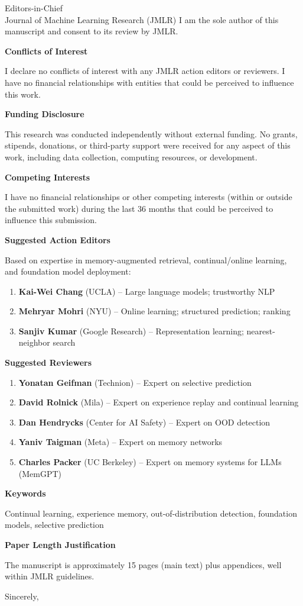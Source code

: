 \documentclass[11pt]{letter}
\begin{document}
\begin{letter}{Editors-in-Chief\\Journal of Machine Learning Research (JMLR)}
I am the sole author of this manuscript and consent to its review by JMLR.

\noindent\textbf{Conflicts of Interest}

I declare no conflicts of interest with any JMLR action editors or reviewers. I have no financial relationships with entities that could be perceived to influence this work.

\noindent\textbf{Funding Disclosure}

This research was conducted independently without external funding. No grants, stipends, donations, or third-party support were received for any aspect of this work, including data collection, computing resources, or development.

\noindent\textbf{Competing Interests}

I have no financial relationships or other competing interests (within or outside the submitted work) during the last 36 months that could be perceived to influence this submission.

\noindent\textbf{Suggested Action Editors}

Based on expertise in memory-augmented retrieval, continual/online learning, and foundation model deployment:
\begin{enumerate}
    \item \textbf{Kai-Wei Chang} (UCLA) -- Large language models; trustworthy NLP
    \item \textbf{Mehryar Mohri} (NYU) -- Online learning; structured prediction; ranking
    \item \textbf{Sanjiv Kumar} (Google Research) -- Representation learning; nearest-neighbor search
\end{enumerate}

\noindent\textbf{Suggested Reviewers}

\begin{enumerate}
    \item \textbf{Yonatan Geifman} (Technion) -- Expert on selective prediction
    \item \textbf{David Rolnick} (Mila) -- Expert on experience replay and continual learning
    \item \textbf{Dan Hendrycks} (Center for AI Safety) -- Expert on OOD detection
    \item \textbf{Yaniv Taigman} (Meta) -- Expert on memory networks
    \item \textbf{Charles Packer} (UC Berkeley) -- Expert on memory systems for LLMs (MemGPT)
\end{enumerate}

\noindent\textbf{Keywords}

Continual learning, experience memory, out-of-distribution detection, foundation models, selective prediction

\noindent\textbf{Paper Length Justification}

The manuscript is approximately 15 pages (main text) plus appendices, well within JMLR guidelines.

\closing{Sincerely,}

\end{letter}
\end{document}
